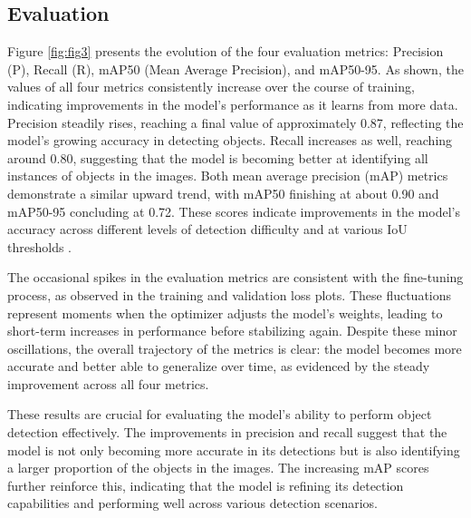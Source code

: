 \documentclass[conference]{IEEEtran}
\begin{document}
\subsection{Evaluation}

Figure \ref{fig:fig3} presents the evolution of the four evaluation metrics: 
Precision (P), 
Recall (R), 
mAP50 (Mean Average Precision), 
and mAP50-95. 
As shown, 
the values of all four metrics consistently increase over the course of training, 
indicating improvements in the model’s performance as it learns from more data. 
Precision steadily rises, 
reaching a final value of approximately 0.87, 
reflecting the model's growing accuracy in detecting objects. 
Recall increases as well, 
reaching around 0.80, 
suggesting that the model is becoming better at identifying all instances of objects in the images. 
Both mean average precision (mAP)
metrics demonstrate a similar upward trend, 
with mAP50 finishing at about 0.90 and mAP50-95 concluding at 0.72. 
These scores indicate improvements in the model's accuracy across different levels of detection difficulty and at various IoU thresholds \cite{yolo11_ultralytics}.

The occasional spikes in the evaluation metrics are consistent with the fine-tuning process, 
as observed in the training and validation loss plots. 
These fluctuations represent moments when the optimizer adjusts the model’s weights, 
leading to short-term increases in performance before stabilizing again. 
Despite these minor oscillations, 
the overall trajectory of the metrics is clear: 
the model becomes more accurate and better able to generalize over time, 
as evidenced by the steady improvement across all four metrics.

These results are crucial for evaluating the model’s ability to perform object detection effectively. 
The improvements in precision and recall suggest that the model is not only becoming more accurate in its detections but is also identifying a larger proportion of the objects in the images. 
The increasing mAP scores further reinforce this, 
indicating that the model is refining its detection capabilities and performing well across various detection scenarios.
\end{document}
